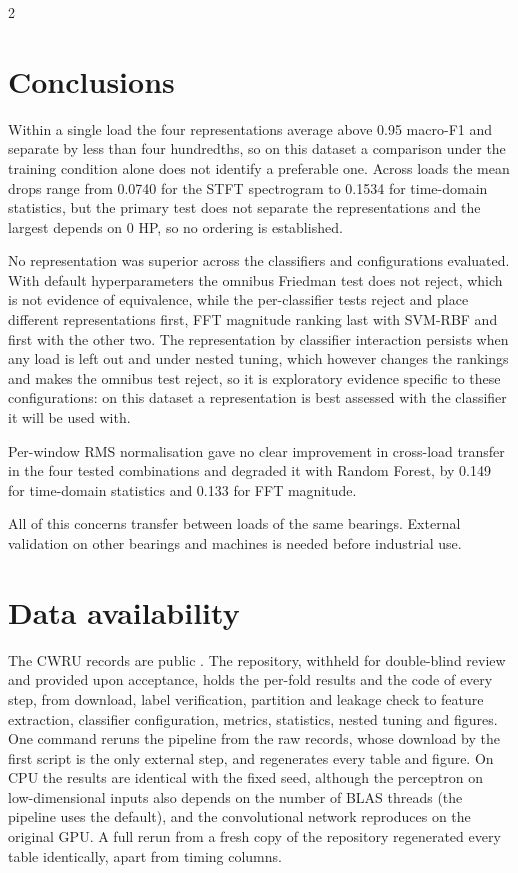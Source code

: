 \documentclass[12pt,twoside,titlepage]{ingenius}
\begin{document}
\begin{multicols}{2}
\section{Conclusions}

Within a single load the four representations average above 0.95 macro-F1 and
separate by less than four hundredths, so on this dataset a comparison under the
training condition alone does not identify a preferable one. Across loads the
mean drops range from 0.0740 for the STFT spectrogram to 0.1534 for time-domain
statistics, but the primary test does not separate the representations and the largest depends on 0 HP, so
no ordering is established.

No representation was superior across the classifiers and configurations
evaluated. With default hyperparameters the omnibus Friedman test does not
reject, which is not evidence of equivalence, while the per-classifier tests
reject and place different representations first, FFT magnitude ranking last
with SVM-RBF and first with the other two. The representation by classifier
interaction persists when any load is left out and under nested tuning, which
however changes the rankings and makes the omnibus test reject, so it is
exploratory evidence specific to these configurations: on this dataset a
representation is best assessed with the classifier it will be used with.

Per-window RMS normalisation gave no clear improvement in cross-load transfer in
the four tested combinations and degraded it with Random Forest, by 0.149 for time-domain
statistics and 0.133 for FFT magnitude.

All of this concerns transfer between loads of the same bearings. External validation on other bearings and machines is needed before industrial use.

\section*{Data availability}

The CWRU records are public \cite{cwru}. The repository, withheld for
double-blind review and provided upon acceptance, holds the per-fold results and
the code of every step, from download, label verification, partition and
leakage check to feature extraction, classifier configuration, metrics,
statistics, nested tuning and figures. One command reruns the pipeline from the
raw records, whose download by the first script is the only external step, and
regenerates every table and figure. On CPU the results are identical with the
fixed seed, although the perceptron on low-dimensional inputs also depends on the number of BLAS threads (the pipeline uses the default), and the
convolutional network reproduces on the original GPU. A full rerun from a fresh copy of the repository
regenerated every table identically, apart from timing columns.



\end{multicols}
\end{document}
